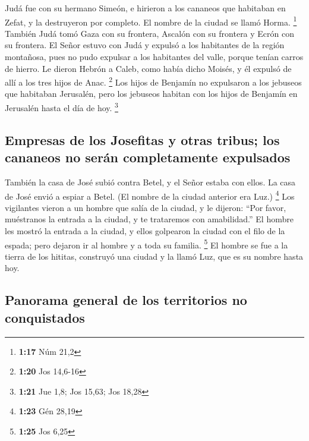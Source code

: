 \begin{paracol}{2}
 Judá fue con su hermano Simeón, e hirieron a los
cananeos que habitaban en Zefat, y la destruyeron por completo. El
nombre de la ciudad se llamó Horma. \footnote{\textbf{1:17} Núm 21,2}
 También Judá tomó Gaza con su frontera, Ascalón con su
frontera y Ecrón con su frontera.  El Señor estuvo con
Judá y expulsó a los habitantes de la región montañosa, pues no pudo
expulsar a los habitantes del valle, porque tenían carros de hierro.
 Le dieron Hebrón a Caleb, como había dicho Moisés, y él
expulsó de allí a los tres hijos de Anac. \footnote{\textbf{1:20} Jos
  14,6-16}  Los hijos de Benjamín no expulsaron a los
jebuseos que habitaban Jerusalén, pero los jebuseos habitan con los
hijos de Benjamín en Jerusalén hasta el día de hoy. \footnote{\textbf{1:21}
  Jue 1,8; Jos 15,63; Jos 18,28}

\hypertarget{empresas-de-los-josefitas-y-otras-tribus-los-cananeos-no-seruxe1n-completamente-expulsados}{%
\subsection{Empresas de los Josefitas y otras tribus; los cananeos no
serán completamente
expulsados}\label{empresas-de-los-josefitas-y-otras-tribus-los-cananeos-no-seruxe1n-completamente-expulsados}}

 También la casa de José subió contra Betel, y el Señor
estaba con ellos.  La casa de José envió a espiar a
Betel. (El nombre de la ciudad anterior era Luz.) \footnote{\textbf{1:23}
  Gén 28,19}  Los vigilantes vieron a un hombre que salía
de la ciudad, y le dijeron: ``Por favor, muéstranos la entrada a la
ciudad, y te trataremos con amabilidad.''  El hombre les
mostró la entrada a la ciudad, y ellos golpearon la ciudad con el filo
de la espada; pero dejaron ir al hombre y a toda su familia. \footnote{\textbf{1:25}
  Jos 6,25}  El hombre se fue a la tierra de los hititas,
construyó una ciudad y la llamó Luz, que es su nombre hasta hoy.

\hypertarget{panorama-general-de-los-territorios-no-conquistados}{%
\subsection{Panorama general de los territorios no
conquistados}\label{panorama-general-de-los-territorios-no-conquistados}}


\end{paracol}
